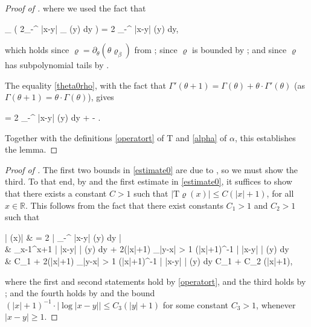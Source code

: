 \documentclass{amsart}
\numberwithin{equation}{section}
\theoremstyle{remark}
\theoremstyle{definition}
\begin{document}
\begin{proof}[Proof of ]
		\noindent where we used the fact that 
		\begin{flalign*}
			\partial_{\theta} \Bigg( 2\theta \displaystyle\int_{-\infty}^{\infty} \log |x-y| \varrho_{\beta} (y) dy \Bigg) = 2 \displaystyle\int_{-\infty}^{\infty} \log |x-y| \varrho (y) dy,
		\end{flalign*} 
	
		\noindent which holds since $\varrho = \partial_{\theta} (\theta \varrho_{\beta})$ from ; since $\varrho$ is bounded by ; and since $\varrho$ has subpolynomial tails by \Cref{fcn}. 
		
		The equality \eqref{theta0rho}, with the fact that $\Gamma' (\theta+1) =  \Gamma (\theta) + \theta \cdot \Gamma' (\theta)$ (as $\Gamma(\theta+1) = \theta \cdot \Gamma (\theta)$), gives   
		\begin{flalign*}
			\displaystyle{} = 2 \theta \displaystyle\int_{-\infty}^{\infty} \log |x-y| \varrho(y) dy + \theta \log \beta - \theta \cdot \displaystyle\frac{\Gamma'(\theta)}{\Gamma (\theta)}.
		\end{flalign*} 
		
		\noindent Together with the definitions \eqref{operatort} of $\bm{\mathrm{T}}$ and \eqref{alpha} of $\alpha$, this establishes the lemma.
	\end{proof}
	
	\begin{proof}[Proof of \Cref{rhoexponential}]
		
		The first two bounds in \eqref{estimate0} are due to \cite[Lemma 2.2]{RET}, so we must show the third. To that end, by  and the first estimate in \eqref{estimate0}, it suffices to show that there exists a constant $C > 1$ such that $|\bm{\mathrm{T}} \varrho (x)| \le C(|x|+1)$, for all $x \in \mathbb{R}$. This follows from the fact that there exist constants $C_1 > 1$ and $C_2 > 1$ such that 
		\begin{flalign*}
			|  \varrho (x)| & = 2 \Bigg| \displaystyle\int_{-\infty}^{\infty} \log |x-y| \varrho(y) dy \Bigg| \\
			&   \displaystyle\int_{x-1}^{x+1} \big| \log |x-y| \big|  \varrho(y) dy + 2(|x|+1)  \displaystyle\int_{|y-x| > 1} (|x|+1)^{-1} \cdot \big| \log |x-y| \big| \cdot \varrho (y) dy  \\
			& \le C_1 + 2(|x|+1)  \displaystyle\int_{|y-x| > 1} (|x|+1)^{-1} \cdot \big| \log |x-y| \big| \cdot \varrho (y) dy   \le C_1 + C_2 (|x|+1),
		\end{flalign*}
	
		\noindent where the first and second statements hold by \eqref{operatort}, and the third holds by ; and the fourth holds by  and the bound $(|x|+1)^{-1} \cdot |\log |x-y|| \le C_3 (|y|+1)$ for some constant $C_3 > 1$, whenever $|x-y| \ge 1$.		
	\end{proof} 
	
\end{document}
